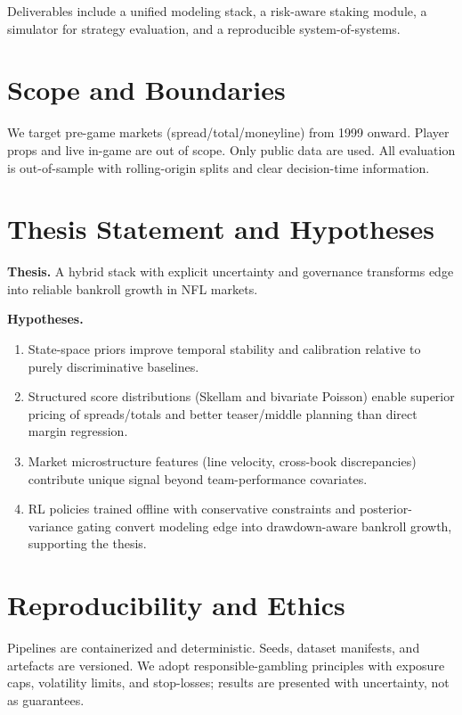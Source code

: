 \noindent Deliverables include a unified modeling stack, a risk-aware staking module, a simulator for strategy evaluation, and a reproducible system-of-systems.


\section{Scope and Boundaries}
We target pre-game markets (spread/total/moneyline) from 1999 onward. Player props and live in-game are out of scope. Only public data are used. All evaluation is out-of-sample with rolling-origin splits and clear decision-time information.

\section{Thesis Statement and Hypotheses}
\textbf{Thesis.} A hybrid stack with explicit uncertainty and governance transforms edge into reliable bankroll growth in NFL markets.

\textbf{Hypotheses.}
\begin{enumerate}
  \item State-space priors improve temporal stability and calibration relative to purely discriminative baselines.
  \item Structured score distributions (Skellam and bivariate Poisson) enable superior pricing of spreads/totals and better teaser/middle planning than direct margin regression.
  \item Market microstructure features (line velocity, cross-book discrepancies) contribute unique signal beyond team-performance covariates.
  \item RL policies trained offline with conservative constraints and posterior-variance gating convert modeling edge into drawdown-aware bankroll growth, supporting the thesis.
\end{enumerate}

\section{Reproducibility and Ethics}
Pipelines are containerized and deterministic. Seeds, dataset manifests, and artefacts are versioned. We adopt responsible-gambling principles with exposure caps, volatility limits, and stop-losses; results are presented with uncertainty, not as guarantees.

